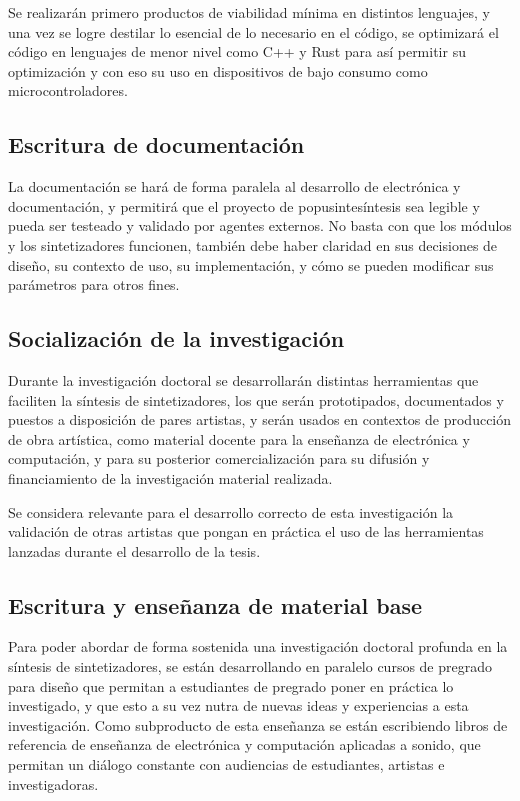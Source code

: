\documentclass[../proyecto.tex]{subfiles}
\begin{document}
Se realizarán primero productos de viabilidad mínima en distintos lenguajes, y una vez se logre destilar lo esencial de lo necesario en el código, se optimizará el código en lenguajes de menor nivel como C++ y Rust para así permitir su optimización y con eso su uso en dispositivos de bajo consumo como microcontroladores. 

\subsection{Escritura de documentación}

La documentación se hará de forma paralela al desarrollo de electrónica y documentación, y permitirá que el proyecto de popusintesíntesis sea legible y pueda ser testeado y validado por agentes externos. No basta con que los módulos y los sintetizadores funcionen, también debe haber claridad en sus decisiones de diseño, su contexto de uso, su implementación, y cómo se pueden modificar sus parámetros para otros fines.

\subsection{Socialización de la investigación}

Durante la investigación doctoral se desarrollarán distintas herramientas que faciliten la síntesis de sintetizadores, los que serán prototipados, documentados y puestos a disposición de pares artistas, y serán usados en contextos de producción de obra artística, como material docente para la enseñanza de electrónica y computación, y para su posterior comercialización para su difusión y financiamiento de la investigación material realizada.

Se considera relevante para el desarrollo correcto de esta investigación la validación de otras artistas que pongan en práctica el uso de las herramientas lanzadas durante el desarrollo de la tesis.

\subsection{Escritura y enseñanza de material base}

Para poder abordar de forma sostenida una investigación doctoral profunda en la síntesis de sintetizadores, se están desarrollando en paralelo cursos de pregrado para diseño que permitan a estudiantes de pregrado poner en práctica lo investigado, y que esto a su vez nutra de nuevas ideas y experiencias a esta investigación. Como subproducto de esta enseñanza se están escribiendo libros de referencia de enseñanza de electrónica y computación aplicadas a sonido, que permitan un diálogo constante con audiencias de estudiantes, artistas e investigadoras.
\end{document}
